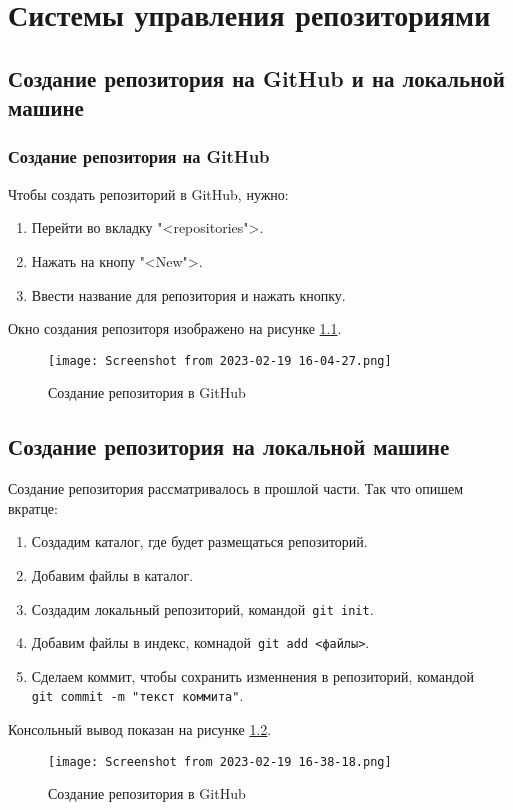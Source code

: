 \graphicspath{{~/Documents/SADT/FirstTask/RMS}}
\chapter{Системы управления репозиториями}

\section{Создание репозитория на GitHub и на локальной машине}
\subsection{Создание репозитория на GitHub}
Чтобы создать репозиторий в GitHub, нужно:
\begin{enumerate}
	\item Перейти во вкладку "<repositories">.
	\item Нажать на кнопу "<New">.
	\item Ввести название для репозитория и нажать кнопку.
\end{enumerate}
Окно создания репозиторя изображено на рисунке \ref{2:fig:GitHub:create_repo}.
\begin{figure}[h!tp]
	\centering
	\texttt{[image: Screenshot from 2023-02-19 16-04-27.png]}
	\caption{Создание репозитория в GitHub}
	\label{2:fig:GitHub:create_repo}
\end{figure}

\section{Создание репозитория на локальной машине}
Создание репозитория рассматривалось в прошлой части. Так что опишем вкратце:
\begin{enumerate}
	\item Создадим каталог, где будет размещаться репозиторий.
	\item Добавим файлы в каталог.
	\item Создадим локальный репозиторий, командой~\texttt{git~init}.
	\item Добавим файлы в индекс, комнадой~\texttt{git~add~<файлы>}.
	\item Сделаем коммит, чтобы сохранить изменнения в репозиторий,
		командой \texttt{git~commit~-m~"текст~коммита"}.
\end{enumerate}
Консольный вывод показан на рисунке \ref{2:fig:git:init}.
\begin{figure}[h!tp]
	\centering
	\texttt{[image: Screenshot from 2023-02-19 16-38-18.png]}
	\caption{Создание репозитория в GitHub}
	\label{2:fig:git:init}
\end{figure}

